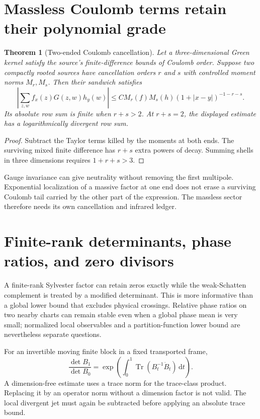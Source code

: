 \documentclass[11pt,a4paper,oneside]{book}
\theoremstyle{plain}
\newtheorem{theorem}{Theorem}[chapter]
\theoremstyle{definition}
\theoremstyle{remark}
\newcommand{\dd}{\mathrm d}
\newcommand{\Tr}{\operatorname{Tr}}
\newcommand{\abs}[1]{\left\lvert#1\right\rvert}
\newcommand{\src}[2]{\cite{#1}}
\begin{document}
\section{Massless Coulomb terms retain their polynomial grade}
\begin{theorem}[Two-ended Coulomb cancellation]
\label{thm:coulomb}
Let a three-dimensional Green kernel satisfy the source's finite-difference bounds of Coulomb order. Suppose two compactly rooted sources have cancellation orders $r$ and $s$ with controlled moment norms $M_r,M_s$. Then their sandwich satisfies
\begin{equation}
 \abs{\sum_{z,w}f_x(z)G(z,w)h_y(w)}
 \le C M_r(f)M_s(h)(1+|x-y|)^{-1-r-s}.
 \label{eq:coulomb}
\end{equation}
Its absolute row sum is finite when $r+s>2$. At $r+s=2$, the displayed estimate has a logarithmically divergent row sum.
\end{theorem}
\begin{proof}
Subtract the Taylor terms killed by the moments at both ends. The surviving mixed finite difference has $r+s$ extra powers of decay. Summing shells in three dimensions requires $1+r+s>3$.
\end{proof}
\src{R5}{thm:v5v91-two-ended}
Gauge invariance can give neutrality without removing the first multipole. Exponential localization of a massive factor at one end does not erase a surviving Coulomb tail carried by the other part of the expression. The massless sector therefore needs its own cancellation and infrared ledger.

\section{Finite-rank determinants, phase ratios, and zero divisors}
A finite-rank Sylvester factor can retain zeros exactly while the weak-Schatten complement is treated by a modified determinant. This is more informative than a global lower bound that excludes physical crossings. Relative phase ratios on two nearby charts can remain stable even when a global phase mean is very small; normalized local observables and a partition-function lower bound are nevertheless separate questions.

For an invertible moving finite block in a fixed transported frame,
\begin{equation}
 \frac{\det B_1}{\det B_0}
 =\exp\left(\int_0^1\Tr(B_t^{-1}\dot B_t)\,\dd t\right).
 \label{eq:logdet-path}
\end{equation}
A dimension-free estimate uses a trace norm for the trace-class product. Replacing it by an operator norm without a dimension factor is not valid. The local divergent jet must again be subtracted before applying an absolute trace bound. \cite{R6,R7,R11}
\end{document}
